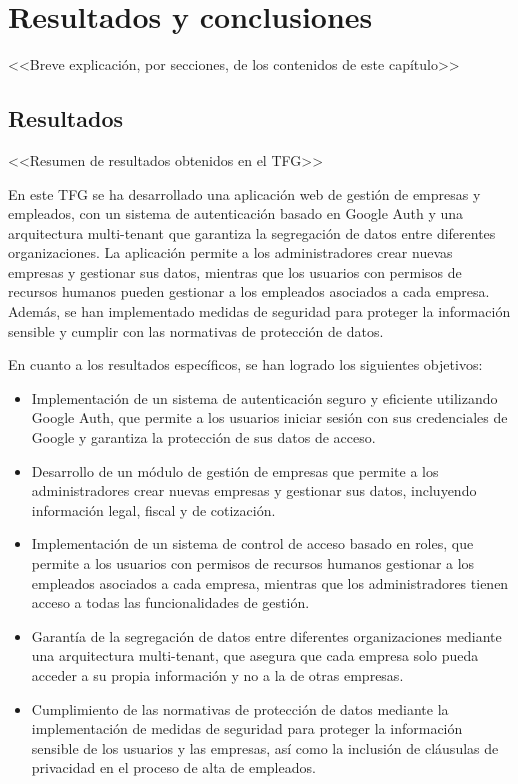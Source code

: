 \chapter{Resultados y conclusiones} \label{chp:resultados}

<<Breve explicación, por secciones, de los contenidos de este capítulo>>


\section{Resultados} \label{sct:resultados_resultados}

<<Resumen de resultados obtenidos en el TFG>>

En este TFG se ha desarrollado una aplicación web de gestión de empresas y empleados, con un sistema de autenticación basado en Google Auth y una arquitectura multi-tenant que garantiza la segregación de datos entre diferentes organizaciones. La aplicación permite a los administradores crear nuevas empresas y gestionar sus datos, mientras que los usuarios con permisos de recursos humanos pueden gestionar a los empleados asociados a cada empresa. Además, se han implementado medidas de seguridad para proteger la información sensible y cumplir con las normativas de protección de datos.

En cuanto a los resultados específicos, se han logrado los siguientes objetivos:
\begin{itemize}
    \item Implementación de un sistema de autenticación seguro y eficiente utilizando Google Auth, que permite a los usuarios iniciar sesión con sus credenciales de Google y garantiza la protección de sus datos de acceso.
    \item Desarrollo de un módulo de gestión de empresas que permite a los administradores crear nuevas empresas y gestionar sus datos, incluyendo información legal, fiscal y de cotización.
    \item Implementación de un sistema de control de acceso basado en roles, que permite a los usuarios con permisos de recursos humanos gestionar a los empleados asociados a cada empresa, mientras que los administradores tienen acceso a todas las funcionalidades de gestión.
    \item Garantía de la segregación de datos entre diferentes organizaciones mediante una arquitectura multi-tenant, que asegura que cada empresa solo pueda acceder a su propia información y no a la de otras empresas.
    \item Cumplimiento de las normativas de protección de datos mediante la implementación de medidas de seguridad para proteger la información sensible de los usuarios y las empresas, así como la inclusión de cláusulas de privacidad en el proceso de alta de empleados.
\end{itemize}


